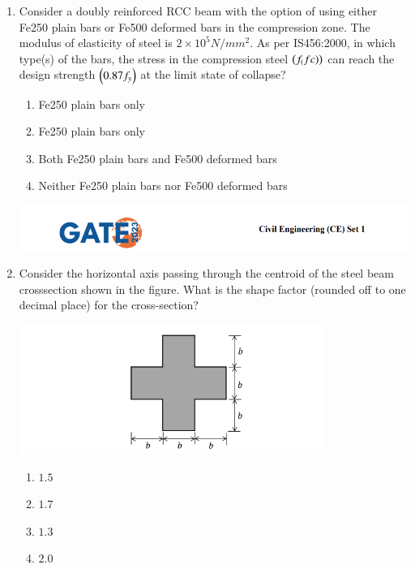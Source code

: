 \documentclass{exam}
\begin{document}
\begin{enumerate}
\item Consider a doubly reinforced RCC beam with the option of using either Fe250 plain bars or Fe500 deformed bars in the compression zone. The modulus of elasticity of steel is $2 \times 10^5 N/mm^2$. As per IS456:2000, in which type(s) of the bars, the stress in the compression steel $\left(f_(fc)\right)$ can reach the design strength $\left(0.87f_y\right)$ at the limit state of collapse?
\begin{enumerate}
    \item Fe250 plain bars only
    \item Fe250 plain bars only
    \item Both Fe250 plain bars and Fe500 deformed bars
    \item Neither Fe250 plain bars nor Fe500 deformed bars
\end{enumerate}
\vspace{0.5cm}

\newpage

\includegraphics[width=\textwidth]{pics/header.png}
\item Consider the horizontal axis passing through the centroid of the steel beam crosssection shown in the figure. What is the shape factor (rounded off to one decimal place) for the cross-section?
\begin{center}
    \includegraphics[width=10cm]{pics/Screenshot 2025-08-05 205813.png}
\end{center}
\begin{enumerate}
    \item $1.5$
    \item $1.7$
    \item $1.3$
    \item $2.0$
\end{enumerate}
\vspace{0.5cm}


\end{enumerate}
\end{document}
